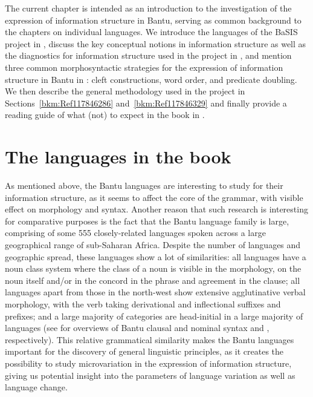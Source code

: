 \documentclass[output=paper]{langscibook}
\begin{document}
The current chapter is intended as an introduction to the investigation of the expression of information structure in Bantu, serving as common background to the chapters on individual languages. We introduce the languages of the BaSIS project in ,  discuss the key conceptual notions in information structure as well as the diagnostics for information structure used in the project in , and mention three common morphosyntactic strategies for the expression of information structure in Bantu in : cleft constructions, word order, and predicate doubling. We then describe the general methodology used in the project in Sections~\ref{bkm:Ref117846286} and~\ref{bkm:Ref117846329} and finally provide a reading guide of what (not) to expect in the book in .

\section{The languages in the book}
\label{bkm:Ref117846249}
As mentioned above, the Bantu languages are interesting to study for their information structure, as it seems to affect the core of the grammar, with visible effect on morphology and syntax. Another reason that such research is interesting for comparative purposes is the fact that the Bantu language family is large, comprising of some 555 closely-related languages \citep{Hammarström2019} spoken across a large geographical range of sub-Saharan Africa. Despite the number of languages and geographic spread, these languages show a lot of similarities: all languages have a noun class system where the class of a noun is visible in the morphology, on the noun itself and/or in the concord in the phrase and agreement in the clause; all languages apart from those in the north-west show extensive agglutinative verbal morphology, with the verb taking derivational and inflectional suffixes and prefixes; and a large majority of categories are head-initial in a large majority of languages (see for overviews of Bantu clausal and nominal syntax \citealt{DowningMarten2019} and \citealt{VandeVelde2019}, respectively). This relative grammatical similarity makes the Bantu languages important for the discovery of general linguistic principles, as it creates the possibility to study microvariation in the expression of information structure, giving us potential insight into the parameters of language variation as well as language change.
\end{document}
